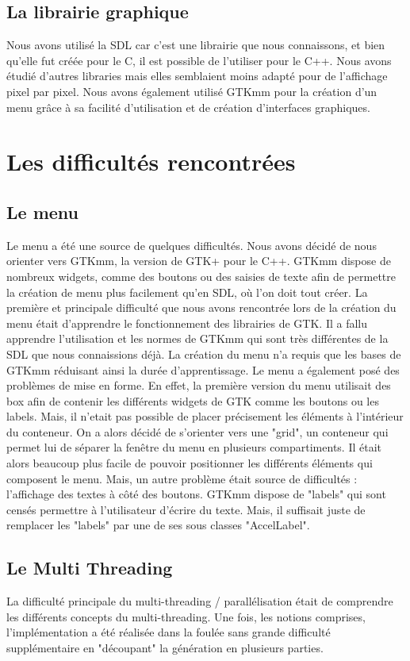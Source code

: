 \documentclass{article}
\begin{document}
    \subsection{La librairie graphique}
    Nous avons utilisé la SDL car c'est une librairie que nous connaissons, et bien qu'elle fut créée pour le C, il est possible de l'utiliser pour le C++.
    Nous avons étudié d'autres libraries mais elles semblaient moins adapté pour de l'affichage pixel par pixel.
	Nous avons également utilisé GTKmm pour la création d'un menu grâce à sa facilité d'utilisation et de création d'interfaces graphiques.

	\section{Les difficultés rencontrées}

	\subsection{Le menu}
	Le menu a été une source de quelques difficultés.
	Nous avons décidé de nous orienter vers GTKmm, la version de GTK+ pour le C++.
	GTKmm dispose de nombreux widgets, comme des boutons ou des saisies de texte afin de permettre la création de menu plus facilement qu'en SDL, où l'on doit tout créer.
	La première et principale difficulté que nous avons rencontrée lors de la création du menu était d'apprendre le fonctionnement des librairies de GTK. Il a fallu apprendre l'utilisation et les normes de GTKmm qui sont très différentes de la SDL que nous connaissions déjà.
	La création du menu n'a requis que les bases de GTKmm réduisant ainsi la durée d'apprentissage.
	Le menu a également posé des problèmes de mise en forme.
	En effet, la première version du menu utilisait des box afin de contenir les différents widgets de GTK comme les boutons ou les labels.
	Mais, il n'etait pas possible de placer précisement les éléments à l'intérieur du conteneur.
	On a alors décidé de s'orienter vers une "grid", un conteneur qui permet lui de séparer la fenêtre du menu en plusieurs compartiments.
	Il était alors beaucoup plus facile de pouvoir positionner les différents éléments qui composent le menu.
	Mais, un autre problème était source de difficultés : l'affichage des textes à côté des boutons.
	GTKmm dispose de "labels" qui sont censés permettre à l'utilisateur d'écrire du texte.
	Mais, il suffisait juste de remplacer les "labels" par une de ses sous classes "AccelLabel".

	\subsection{Le Multi Threading}
	La difficulté principale du multi-threading / parallélisation était de comprendre les différents concepts du multi-threading.
	Une fois, les notions comprises, l'implémentation a été réalisée dans la foulée sans grande difficulté supplémentaire en "découpant" la génération en plusieurs parties.
\end{document}
